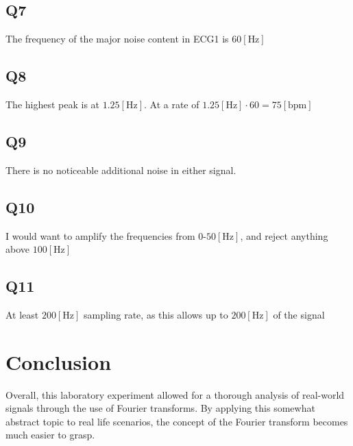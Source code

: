 \documentclass[
	letterpaper, %
	10pt, %
]{CSUniSchoolLabReport}
\begin{document}
\subsection{Q7} The frequency of the major noise content in ECG1 is $60[\si{\hertz}]$

\subsection{Q8} The highest peak is at $1.25[\si{\hertz}]$. At a rate of $1.25[\si{\hertz}]\cdot60=75[\text{bpm}]$

\subsection{Q9} There is no noticeable additional noise in either signal.

\subsection{Q10} I would want to amplify the frequencies from $0$-$50[\si{\hertz}]$, and reject anything above $100[\si{\hertz}]$

\subsection{Q11} At least $200[\si{\hertz}]$ sampling rate, as this allows up to $200[\si{\hertz}]$ of the signal

\section{Conclusion}

Overall, this laboratory experiment allowed for a thorough analysis of real-world signals through the use of Fourier transforms. By applying this somewhat abstract topic to real life scenarios, the concept of the Fourier transform becomes much easier to grasp.
\end{document}
